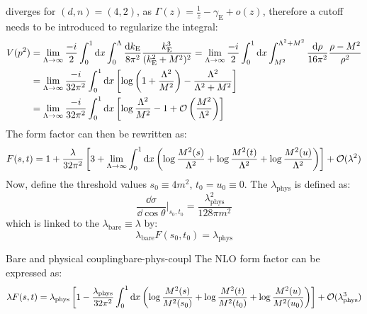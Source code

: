  diverges for $ (d,n) = (4,2) $, as $ \Gamma(z) = \frac{1}{z} - \gamma_\text{E} + o(z) $, therefore a cutoff needs to be introduced to regularize the integral:
\begin{equation*}
  \begin{split}
    V(p^2)
    & = \lim_{\Lambda \rightarrow \infty} \frac{-i}{2} \int_0^1 \mathrm{d} x \int_0^\Lambda \frac{\mathrm{d} k_\text{E}}{8\pi^2} \frac{k_\text{E}^3}{(k_\text{E}^2 + M^2)^2} = \lim_{\Lambda \rightarrow \infty} \frac{-i}{2} \int_0^1 \mathrm{d} x \int_{M^2}^{\Lambda^2 + M^2} \frac{\mathrm{d} \rho}{16\pi^2} \frac{\rho - M^2}{\rho^2} \\
    & = \lim_{\Lambda \rightarrow \infty} \frac{-i}{32 \pi^2} \int_0^1 \mathrm{d} x \left[ \log \left( 1 + \frac{\Lambda^2}{M^2} \right) - \frac{\Lambda^2}{\Lambda^2 + M^2} \right] \\
    & = \lim_{\Lambda \rightarrow \infty} \frac{-i}{32\pi^2} \int_0^1 \mathrm{d} x \left[ \log \frac{\Lambda^2}{M^2} - 1 + \mathcal{O}  \left( \frac{M^2}{\Lambda^2} \right) \right]
  \end{split}
\end{equation*}
The form factor can then be rewritten as:
\begin{equation}
  F(s,t) = 1 + \frac{\lambda}{32\pi^2} \left[ 3 + \lim_{\Lambda \rightarrow \infty} \int_0^1 \mathrm{d} x \left( \log \frac{M^2(s)}{\Lambda^2} + \log \frac{M^2(t)}{\Lambda^2} + \log \frac{M^2(u)}{\Lambda^2} \right) \right] + \mathcal{O}(\lambda^2)
  \label{eq:form-factor}
\end{equation}
Now, define the threshold values $ s_0 \equiv 4m^2 $, $ t_0 = u_0 \equiv 0 $. The  $ \lambda_\text{phys} $ is defined as:
\begin{equation}
  \frac{\dd \sigma}{\dd \cos \theta}\bigg\vert_{s_0 , t_0} = \frac{\lambda_\text{phys}^2}{128\pi m^2}
\end{equation}
which is linked to the  $ \lambda_\text{bare} \equiv \lambda $ by:
\begin{equation}
  \lambda_\text{bare} F(s_0,t_0) = \lambda_\text{phys}
  \label{eq:bare-phys-def}
\end{equation}

\begin{proposition}{Bare and physical coupling}{bare-phys-coupl}
  The NLO form factor can be expressed as:
  \begin{equation}
    \lambda F(s,t) = \lambda_\text{phys} \left[ 1 - \frac{\lambda_\text{phys}}{32\pi^2} \int_0^1 \mathrm{d} x \left( \log \frac{M^2(s)}{M^2(s_0)} + \log \frac{M^2(t)}{M^2(t_0)} + \log \frac{M^2(u)}{M^2(u_0)} \right) \right] + \mathcal{O}(\lambda_\text{phys}^3)
    \label{eq:l-f-cutoff}
  \end{equation}
\end{proposition}

